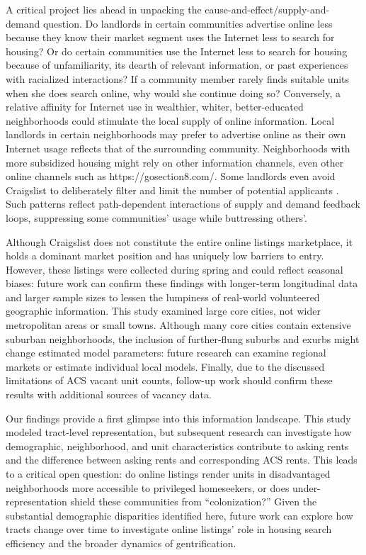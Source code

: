 \documentclass[11pt,letterpaper]{article}
\begin{document}
A critical project lies ahead in unpacking the cause-and-effect/supply-and-demand question. Do landlords in certain communities advertise online less because they know their market segment uses the Internet less to search for housing? Or do certain communities use the Internet less to search for housing because of unfamiliarity, its dearth of relevant information, or past experiences with racialized interactions? If a community member rarely finds suitable units when she does search online, why would she continue doing so? Conversely, a relative affinity for Internet use in wealthier, whiter, better-educated neighborhoods could stimulate the local supply of online information. Local landlords in certain neighborhoods may prefer to advertise online as their own Internet usage reflects that of the surrounding community. Neighborhoods with more subsidized housing might rely on other information channels, even other online channels such as https://gosection8.com/. Some landlords even avoid Craigslist to deliberately filter and limit the number of potential applicants \citep{mendez_professional_2016}. Such patterns reflect path-dependent interactions of supply and demand feedback loops, suppressing some communities' usage while buttressing others'.

Although Craigslist does not constitute the entire online listings marketplace, it holds a dominant market position and has uniquely low barriers to entry. However, these listings were collected during spring and could reflect seasonal biases: future work can confirm these findings with longer-term longitudinal data and larger sample sizes to lessen the lumpiness of real-world volunteered geographic information. This study examined large core cities, not wider metropolitan areas or small towns. Although many core cities contain extensive suburban neighborhoods, the inclusion of further-flung suburbs and exurbs might change estimated model parameters: future research can examine regional markets or estimate individual local models. Finally, due to the discussed limitations of ACS vacant unit counts, follow-up work should confirm these results with additional sources of vacancy data.

Our findings provide a first glimpse into this information landscape. This study modeled tract-level representation, but subsequent research can investigate how demographic, neighborhood, and unit characteristics contribute to asking rents and the difference between asking rents and corresponding ACS rents. This leads to a critical open question: do online listings render units in disadvantaged neighborhoods more accessible to privileged homeseekers, or does under-representation shield these communities from \enquote{colonization?} Given the substantial demographic disparities identified here, future work can explore how tracts change over time to investigate online listings' role in housing search efficiency and the broader dynamics of gentrification.
\end{document}
